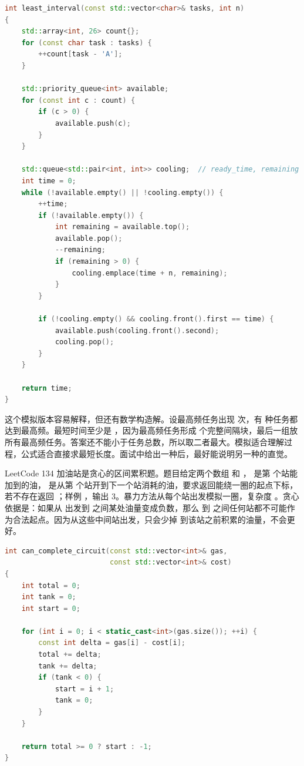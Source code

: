 \begin{lstlisting}[language=C++,caption={LeetCode 621 任务调度器：堆处理可执行任务，队列处理冷却}]
int least_interval(const std::vector<char>& tasks, int n)
{
    std::array<int, 26> count{};
    for (const char task : tasks) {
        ++count[task - 'A'];
    }

    std::priority_queue<int> available;
    for (const int c : count) {
        if (c > 0) {
            available.push(c);
        }
    }

    std::queue<std::pair<int, int>> cooling;  // ready_time, remaining
    int time = 0;
    while (!available.empty() || !cooling.empty()) {
        ++time;
        if (!available.empty()) {
            int remaining = available.top();
            available.pop();
            --remaining;
            if (remaining > 0) {
                cooling.emplace(time + n, remaining);
            }
        }

        if (!cooling.empty() && cooling.front().first == time) {
            available.push(cooling.front().second);
            cooling.pop();
        }
    }

    return time;
}
\end{lstlisting}

这个模拟版本容易解释，但还有数学构造解。设最高频任务出现  次，有  种任务都达到最高频。最短时间至少是 ，因为最高频任务形成  个完整间隔块，最后一组放所有最高频任务。答案还不能小于任务总数，所以取二者最大。模拟适合理解过程，公式适合直接求最短长度。面试中给出一种后，最好能说明另一种的直觉。

LeetCode 134 加油站是贪心的区间累积题。题目给定两个数组  和 ， 是第  个站能加到的油， 是从第  个站开到下一个站消耗的油，要求返回能绕一圈的起点下标，若不存在返回 ；样例 ，输出 3。暴力方法从每个站出发模拟一圈，复杂度 。贪心依据是：如果从  出发到  之间某处油量变成负数，那么  到  之间任何站都不可能作为合法起点。因为从这些中间站出发，只会少掉  到该站之前积累的油量，不会更好。

\begin{lstlisting}[language=C++,caption={LeetCode 134 加油站：失败区间整体跳过}]
int can_complete_circuit(const std::vector<int>& gas,
                         const std::vector<int>& cost)
{
    int total = 0;
    int tank = 0;
    int start = 0;

    for (int i = 0; i < static_cast<int>(gas.size()); ++i) {
        const int delta = gas[i] - cost[i];
        total += delta;
        tank += delta;
        if (tank < 0) {
            start = i + 1;
            tank = 0;
        }
    }

    return total >= 0 ? start : -1;
}
\end{lstlisting}

